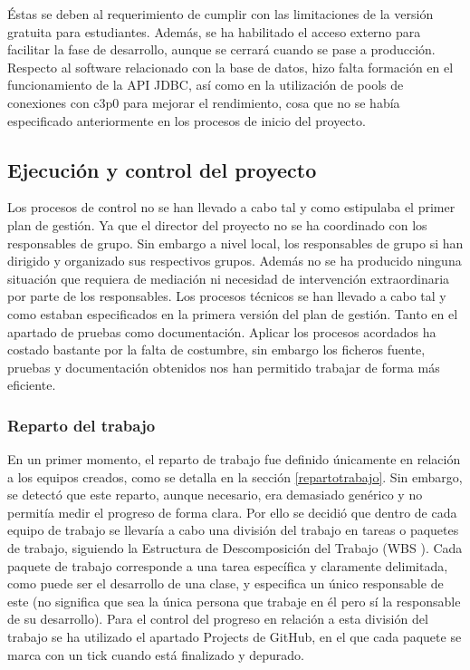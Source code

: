 Éstas se deben al requerimiento de cumplir con las limitaciones de la versión gratuita para estudiantes. Además, se ha habilitado el acceso externo para facilitar la fase de desarrollo, aunque se cerrará cuando se pase a producción. Respecto al software relacionado con la base de datos, hizo falta formación en el funcionamiento de la API JDBC, así como en la utilización de pools de conexiones con c3p0 para mejorar el rendimiento, cosa que no se había especificado anteriormente en los procesos de inicio del proyecto.

\subsection{Ejecución y control del proyecto}
\label{Ejecucion y control del proyecto}
Los procesos de control no se han llevado a cabo tal y como estipulaba el primer plan de gestión. Ya que el director del proyecto no se ha coordinado con los responsables de grupo. Sin embargo a nivel local, los responsables de grupo si han dirigido y organizado sus respectivos grupos. Además no se ha producido ninguna situación que requiera de mediación ni necesidad de intervención extraordinaria por parte de los responsables. 
Los procesos técnicos se han llevado a cabo tal y como estaban especificados en la primera versión del plan de gestión. Tanto en el apartado de pruebas como documentación. Aplicar los procesos acordados ha costado bastante por la falta de costumbre, sin embargo los ficheros fuente, pruebas y documentación obtenidos nos han permitido trabajar de forma más eficiente.
\subsubsection{Reparto del trabajo}
En un primer momento, el reparto de trabajo fue definido únicamente en relación a los equipos creados, como se detalla en la sección \ref{repartotrabajo}. Sin embargo, se detectó que este reparto, aunque necesario, era demasiado genérico y no permitía medir el progreso de forma clara. Por ello se decidió que dentro de cada equipo de trabajo se llevaría a cabo una división del trabajo en tareas o paquetes de trabajo, siguiendo la Estructura de Descomposición del Trabajo (WBS \cite{edt}). Cada paquete de trabajo corresponde a una tarea específica y claramente delimitada, como puede ser el desarrollo de una clase, y especifica un único responsable de este (no significa que sea la única persona que trabaje en él pero sí la responsable de su desarrollo). Para el control del progreso en relación a esta división del trabajo se ha utilizado el apartado Projects de GitHub, en el que cada paquete se marca con un tick cuando está finalizado y depurado.

